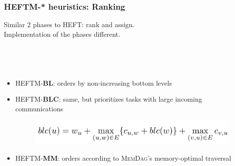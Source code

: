 \documentclass[xcolor=svgnames,titlepage,english,presentation]{beamer}
\begin{document}
\begin{frame}[t]
    \frametitle{HEFTM-* heuristics: Ranking}
    
    Similar 2 phases to HEFT: rank and assign. \\[0.5ex]
    Implementation of the phases different.

 ~~~~~
\pause

  ~~~~~

   
    \begin{itemize}
        \item HEFTM-\textbf{BL}: orders by non-increasing bottom levels
        \item HEFTM-\textbf{BLC}: same, but prioritizes tasks with large incoming communications \\ 
            \begin{figure}
            \centering
            \includegraphics[scale=0.2]{diagrams/images/BLC-formula.png}
        \end{figure}
        
        \item HEFTM-\textbf{MM}: orders according to \textsc{MemDag}'s memory-optimal traversal
        
    \end{itemize}
     
 
   

\end{frame}
\end{document}
